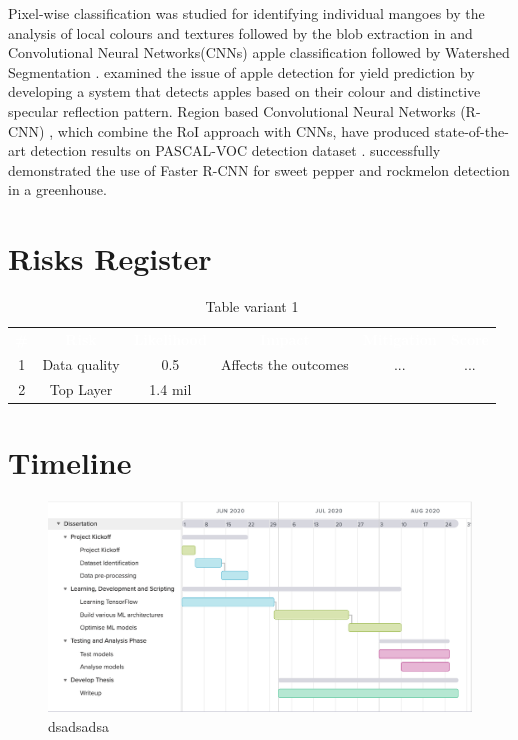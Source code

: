 \documentclass[12pt]{article}
\newcommand{\head}[1]{%
    \textcolor{white}{\textbf{#1}}}
\begin{document}
Pixel-wise classification was studied for identifying individual mangoes by the analysis of local colours and textures followed by the blob extraction in \cite{PAYNE2014160} and Convolutional Neural Networks(CNNs) apple classification followed by Watershed Segmentation \cite{sa2016deepfruits}. \cite{inproceedings_wang} examined the issue of apple detection for yield prediction by developing a system that detects apples based on their colour and distinctive specular reflection pattern. Region based Convolutional Neural Networks (R-CNN) \cite{7112511_Girshick}, which combine the RoI approach
with CNNs, have produced state-of-the-art detection results
on PASCAL-VOC detection dataset \cite{everingham2010pascal}. \cite{sa2016deepfruits} successfully demonstrated the use of Faster R-CNN for sweet pepper and rockmelon detection in a greenhouse.



\section{Risks Register}
   
\begin{table}[!h]
    \centering
    \sffamily
    \caption{Table variant 1} \label{tb:1}
    \begin{tabular}{|cccccc|}
        \rowcolor{black!75}
        \head{\#} & \head{Risk }& \head{Likelihood} & \head{Impact} & \head{Mitigation} & \head{Score}\\ 
        1 & Data quality & 0.5 & Affects the outcomes & ... & ...  \\ 
        \hline 
        2 & Top Layer & 1.4 mil &  \\ 
    \end{tabular} 
\end{table}



    
\section{Timeline}
   
\begin{figure}[!ht]
  \includegraphics[width=\linewidth,scale=0.5]{timeline.png}
  \caption{dsadsadsa}
\end{figure}
   
\printbibliography
 
\end{document}

